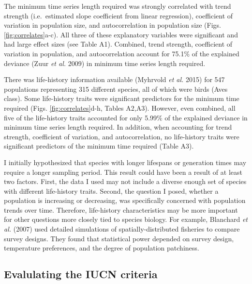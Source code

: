 \documentclass[12pt,]{article}
\begin{document}
The minimum time series length required was strongly correlated with
trend strength (i.e.~estimated slope coefficient from linear
regression), coefficient of variation in population size, and
autocorrelation in population size (Figs. \ref{fig:correlates}a-c). All
three of these explanatory variables were significant and had large
effect sizes (see Table A1). Combined, trend strength, coefficient of
variation in population, and autocorrelation account for 75.1\% of the
explained deviance (Zuur \emph{et al.} 2009) in minimum time series
length required.

There was life-history information available (Myhrvold \emph{et al.}
2015) for 547 populations representing 315 different species, all of
which were birds (Aves class). Some life-history traits were significant
predictors for the minimum time required (Figs. \ref{fig:correlates}d-h,
Tables A2,A3). However, even combined, all five of the life-history
traits accounted for only 5.99\% of the explained deviance in minimum
time series length required. In addition, when accounting for trend
strength, coefficient of variation, and autocorrelation, no life-history
traits were significant predictors of the minimum time required (Table
A3).

I initially hypothesized that species with longer lifespans or
generation times may require a longer sampling period. This result could
have been a result of at least two factors. First, the data I used may
not include a diverse enough set of species with different life-history
traits. Second, the question I posed, whether a population is increasing
or decreasing, was specifically concerned with population trends over
time. Therefore, life-history characteristics may be more important for
other questions more closely tied to species biology. For example,
Blanchard \emph{et al.} (2007) used detailed simulations of
spatially-distributed fisheries to compare survey designs. They found
that statistical power depended on survey design, temperature
preferences, and the degree of population patchiness.

\subsection{Evalulating the IUCN
criteria}\label{evalulating-the-iucn-criteria}
\end{document}
